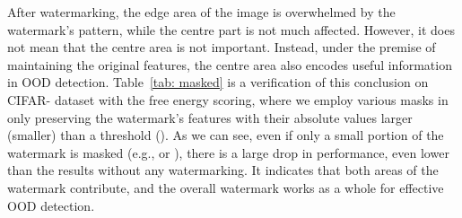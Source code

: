 \documentclass{article}
\begin{document}
{After watermarking, the edge area of the image is overwhelmed by the watermark's pattern, while the centre part is not much affected. However, it does not mean that the centre area is not important. Instead, under the premise of maintaining the original features, the centre area also encodes useful information in OOD detection. Table~\ref{tab: masked} is a verification of this conclusion on CIFAR- dataset with the free energy scoring, where we employ various masks in only preserving the watermark's features with their absolute values larger (smaller) than a threshold  (). As we can see, even if only a small portion of the watermark is masked (e.g.,  or ), there is a large drop in performance, even lower than the results without any watermarking. It indicates that both areas of the watermark contribute, and the overall watermark works as a whole for effective OOD detection. }
\end{document}
